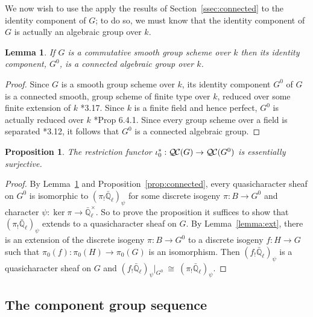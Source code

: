 \documentclass{amsart}
\theoremstyle{plain}
\newtheorem{proposition}[theorem]{Proposition}
\newtheorem{lemma}[theorem]{Lemma}
\theoremstyle{definition}
\theoremstyle{remark}
\newcommand{\EE}{\mathbb{\bar Q}_\ell}
\newcommand{\Fq}{k}
\newcommand{\EEx}{\EE^\times}
\newcommand{\iso}{{\ \cong\ }}
\newcommand{\qcs}[1]{{\mathcal{#1}}}
\newcommand{\QC}{{\mathcal{Q\hskip-0.8pt C}}}
\begin{document}
We now wish to use the apply the results of Section~\ref{ssec:connected} to the identity component of $G$; to do so, we must know that the identity component of $G$ is actually an algebraic group over $\Fq$.

\begin{lemma} \label{lem:G0alg-grp}
If $G$ is a commutative smooth group scheme over $\Fq$ then its identity component, $G^0$, is a connected algebraic group over $\Fq$.
\end{lemma}
\begin{proof}
 Since $G$ is a smooth group scheme over $\Fq$, its
 identity component $G^0$ of $G$ is a connected smooth,
 group scheme of finite type over $\Fq$, reduced over some finite extension of $\Fq$
 \cite{vdGeer-Moonen:AbelianVarieties}*{3.17}.
 Since $\Fq$ is a finite field and hence perfect, $G^0$ is actually reduced over $\Fq$
 \cite{EGAIV2}*{Prop 6.4.1}.  Since every group scheme over a field is separated
 \cite{vdGeer-Moonen:AbelianVarieties}*{3.12},
 it follows that $G^0$ is a connected algebraic group.
\end{proof}

\begin{proposition}\label{prop:restriction}
The restriction functor $\iota_0^* : \QC(G)\to \QC(G^0)$ is essentially surjective.
\end{proposition}

\begin{proof}
  By Lemma~\ref{lem:G0alg-grp} and Proposition~\ref{prop:connected}, every
  quasicharacter sheaf on $G^0$ is isomorphic to $(\pi_! \EE)_\psi$ for some discrete isogeny $\pi : B \to G^0$ and character $\psi : \ker \pi \to \EEx$.
  So to prove the proposition it suffices to show that $(\pi_! \EE)_\psi$ extends to a quasicharacter sheaf on $G$.
%
 By Lemma~\ref{lemma:ext}, there is an extension of the
 discrete isogeny $\pi : B \to G^0$ to a discrete isogeny $f : H \to G$
 such that $\pi_0(f) : \pi_0(H)\to \pi_0(G)$ is an isomorphism.
 Then $(f_! \EE)_\psi$ is a quasicharacter sheaf on $G$ and
 $(f_! \EE)_\psi\vert_{G^0} \iso (\pi_! \EE)_\psi$.
\end{proof}

\subsection{The component group sequence} \label{sec:component}
\end{document}

